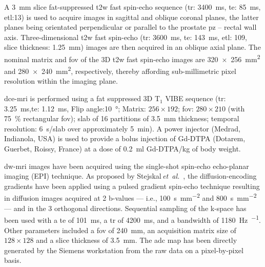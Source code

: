 \documentclass[final,3p,times,twocolumn]{elsarticle}
\begin{document}
A \SI{3}{\mm} slice fat-suppressed \ac{t2w} fast spin-echo sequence (\ac{tr}:
\SI{3400}{\ms}, \ac{te}: \SI{85}{\ms}, \ac{etl}:13) is used to acquire images
in sagittal and oblique coronal planes, the latter planes being orientated
perpendicular or parallel to the prostate \ac{pz} – rectal wall axis.
Three-dimensional \ac{t2w} fast spin-echo (\ac{tr}: \SI{3600}{\ms}, \ac{te}:
\SI{143}{\ms}, \ac{etl}: 109, slice thickness: \SI{1.25}{\mm}) images are then
acquired in an oblique axial plane.  The nominal matrix and \ac{fov} of the 3D
\ac{t2w} fast spin-echo images are
\SI[product-units=repeat]{320x256}{\milli\metre\squared} and
\SI[product-units=repeat]{280x240}{\milli\metre\squared}, respectively, thereby
affording sub-millimetric pixel resolution within the imaging plane.

\ac{dce}-\ac{mri} is performed using a fat suppressed 3D T$_1$ VIBE sequence
(\ac{tr}: \SI{3.25}{\ms},\ac{te}: \SI{1.12}{\ms}, Flip angle:\SI{10}{\degree};
Matrix: $256 \times 192$; \ac{fov}: $280 \times 210$ (with \SI{75}{\percent}
rectangular \ac{fov}); slab of 16 partitions of \SI{3.5}{\mm} thickness;
temporal resolution: \SI{6}{\s}/slab over approximately \SI{5}{\minute}).  A
power injector (Medrad, Indianola, USA) is used to provide a bolus injection of
Gd-DTPA (Dotarem, Guerbet, Roissy, France) at a dose of \SI{0.2}{\ml}
Gd-DTPA/kg of body weight.

\ac{dw}-\ac{mri} images have been acquired using the single-shot spin-echo
echo-planar imaging (EPI) technique.  As proposed by
Stejskal\,\emph{et~al.}~\cite{stejskal1965spin}, the diffusion-encoding
gradients have been applied using a pulsed gradient spin-echo technique
resulting in diffusion images acquired at 2 b-values --- i.e.,
\SI{100}{\second\per\milli\meter\squared} and
\SI{800}{\second\per\milli\meter\squared} --- and in the 3 orthogonal
directions.  Sequential sampling of the k-space has been used with a \ac{te} of
\SI{101}{\ms}, a \ac{tr} of \SI{4200}{\ms}, and a bandwidth of
\SI{1180}{\hertz\per\px}.  Other parameters included a \ac{fov} of
\SI{240}{\milli\metre}, an acquisition matrix size of $128 \times 128$ and a
slice thickness of \SI{3.5}{\milli\metre}.  The \ac{adc} map has been directly
generated by the Siemens workstation from the raw data on a pixel-by-pixel
basis.
\end{document}
